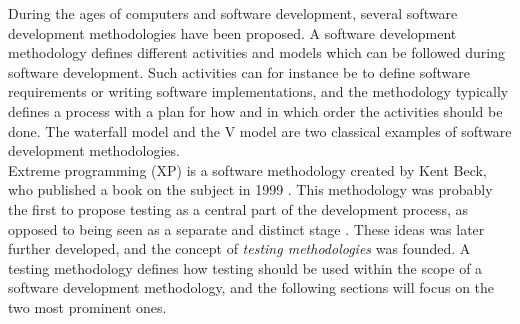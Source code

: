 
During the ages of computers and software development, several software
development methodologies have been proposed. A software development
methodology defines different activities and models which can be
followed during software development. Such activities can for instance
be to define software requirements or writing software implementations,
and the methodology typically defines a process with a plan for how and
in which order the activities should be done. The waterfall model and
the V model are two classical examples of software development
methodologies.\cite{article:sw_methodologies}\\

Extreme programming (XP) is a software methodology created by Kent Beck,
who published a book on the subject in 1999 \cite{wiki:xp}. This
methodology was probably the first to propose testing as a central part
of the development process, as opposed to being seen as a separate and
distinct stage \cite{article:sw_methodologies}. These ideas was later
further developed, and the concept of \emph{testing methodologies} was
founded. A testing methodology defines how testing should be used within
the scope of a software development methodology, and the following
sections will focus on the two most prominent ones.\\
